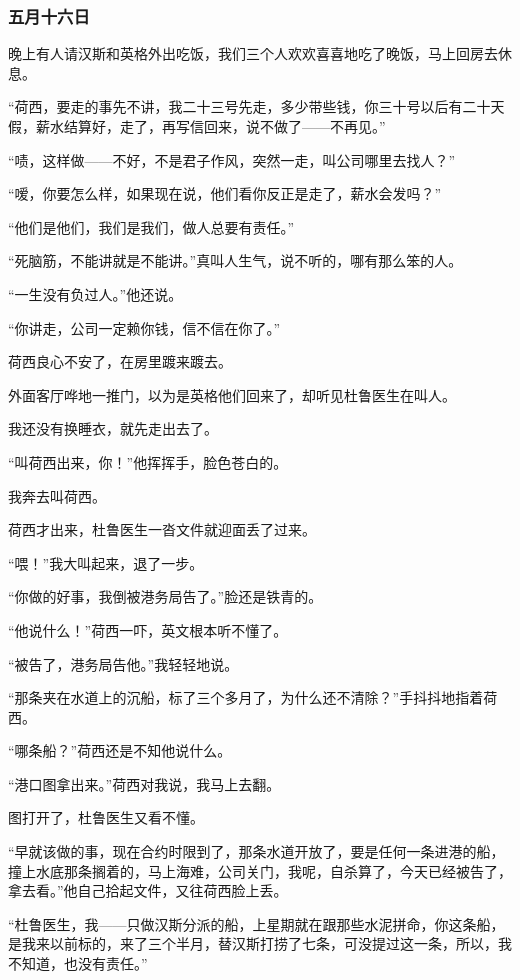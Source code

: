 \subsubsection{五月十六日}
\par 晚上有人请汉斯和英格外出吃饭，我们三个人欢欢喜喜地吃了晚饭，马上回房去休息。
\par “荷西，要走的事先不讲，我二十三号先走，多少带些钱，你三十号以后有二十天假，薪水结算好，走了，再写信回来，说不做了——不再见。”
\par “啧，这样做——不好，不是君子作风，突然一走，叫公司哪里去找人？”
\par “嗳，你要怎么样，如果现在说，他们看你反正是走了，薪水会发吗？”
\par “他们是他们，我们是我们，做人总要有责任。”
\par “死脑筋，不能讲就是不能讲。”真叫人生气，说不听的，哪有那么笨的人。
\par “一生没有负过人。”他还说。
\par “你讲走，公司一定赖你钱，信不信在你了。”
\par 荷西良心不安了，在房里踱来踱去。
\par 外面客厅哗地一推门，以为是英格他们回来了，却听见杜鲁医生在叫人。
\par 我还没有换睡衣，就先走出去了。
\par “叫荷西出来，你！”他挥挥手，脸色苍白的。
\par 我奔去叫荷西。
\par 荷西才出来，杜鲁医生一沓文件就迎面丢了过来。
\par “喂！”我大叫起来，退了一步。
\par “你做的好事，我倒被港务局告了。”脸还是铁青的。
\par “他说什么！”荷西一吓，英文根本听不懂了。
\par “被告了，港务局告他。”我轻轻地说。
\par “那条夹在水道上的沉船，标了三个多月了，为什么还不清除？”手抖抖地指着荷西。
\par “哪条船？”荷西还是不知他说什么。
\par “港口图拿出来。”荷西对我说，我马上去翻。
\par 图打开了，杜鲁医生又看不懂。
\par “早就该做的事，现在合约时限到了，那条水道开放了，要是任何一条进港的船，撞上水底那条搁着的，马上海难，公司关门，我呢，自杀算了，今天已经被告了，拿去看。”他自己拾起文件，又往荷西脸上丢。
\par “杜鲁医生，我——只做汉斯分派的船，上星期就在跟那些水泥拼命，你这条船，是我来以前标的，来了三个半月，替汉斯打捞了七条，可没提过这一条，所以，我不知道，也没有责任。”
